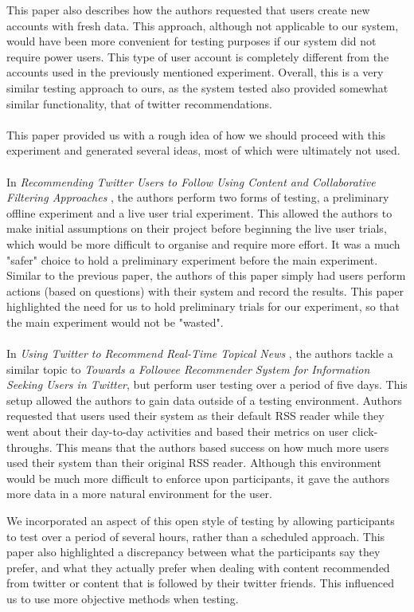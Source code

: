 \documentclass{article}
\begin{document}
This paper also describes how the authors requested that users create new accounts with fresh data. This approach, although not applicable to our system, would have been more convenient for testing purposes if our system did not require power users. This type of user account is completely different from the accounts used in the previously mentioned experiment. Overall, this is a very similar testing approach to ours, as the system tested also provided somewhat similar functionality, that of twitter recommendations.
\\\\
This paper provided us with a rough idea of how we should proceed with this experiment and generated several ideas, most of which were ultimately not used.
\\\\
In \textit{Recommending Twitter Users to Follow Using Content and
Collaborative Filtering Approaches} \cite{paper2}, the authors perform two forms of testing, a preliminary offline experiment and a live user trial experiment. This allowed the authors to make initial assumptions on their project before beginning the live user trials, which would be more difficult to organise and require more effort. It was a much "safer" choice to hold a preliminary experiment before the main experiment. Similar to the previous paper, the authors of this paper simply had users perform actions (based on questions) with their system and record the results. This paper highlighted the need for us to hold preliminary trials for our experiment, so that the main experiment would not be "wasted".
\\\\
In \textit{Using Twitter to Recommend Real-Time Topical News} \cite{paper3}, the authors tackle a similar topic to \textit{Towards a Followee Recommender System for Information Seeking Users in Twitter}, but perform user testing over a period of five days. This setup allowed the authors to gain data outside of a testing environment. Authors requested that users used their system as their default RSS reader while they went about their day-to-day activities and based their metrics on user click-throughs. This means that the authors based success on how much more users used their system than their original RSS reader. Although this environment would be much more difficult to enforce upon participants, it gave the authors more data in a more natural environment for the user. 

We incorporated an aspect of this open style of testing by allowing participants to test over a period of several hours, rather than a scheduled approach. This paper also highlighted a discrepancy between what the participants say they prefer, and what they actually prefer when dealing with content recommended from twitter or content that is followed by their twitter friends. This influenced us to use more objective methods when testing.
\end{document}

